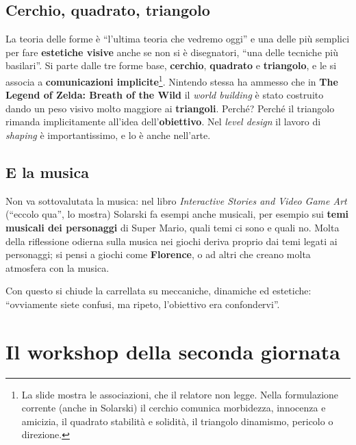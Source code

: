 \subsection{Cerchio, quadrato, triangolo}

La teoria delle forme è ``l'ultima teoria che vedremo oggi'' e una delle più
semplici per fare \textbf{estetiche visive} anche se non si è disegnatori, ``una
delle tecniche più basilari''. Si parte dalle tre forme base, \textbf{cerchio},
\textbf{quadrato} e \textbf{triangolo}, e le si associa a \textbf{comunicazioni
implicite}\footnote{La slide mostra le associazioni, che il relatore non legge.
Nella formulazione corrente (anche in Solarski) il cerchio comunica morbidezza,
innocenza e amicizia, il quadrato stabilità e solidità, il triangolo dinamismo,
pericolo o direzione.}. Nintendo stessa ha ammesso che in \textbf{The Legend of
Zelda: Breath of the Wild} il \emph{world building} è stato costruito dando un
peso visivo molto maggiore ai \textbf{triangoli}. Perché? Perché il triangolo
rimanda implicitamente all'idea dell'\textbf{obiettivo}. Nel \emph{level design} il
lavoro di \emph{shaping} è importantissimo, e lo è anche nell'arte.

\subsection{E la musica}

Non va sottovalutata la musica: nel libro \emph{Interactive Stories and Video
Game Art} (``eccolo qua'', lo mostra) Solarski fa esempi anche musicali, per
esempio sui \textbf{temi musicali dei personaggi} di Super Mario, quali temi ci
sono e quali no. Molta della riflessione odierna sulla musica nei giochi deriva
proprio dai temi legati ai personaggi; si pensi a giochi come \textbf{Florence}, o
ad altri che creano molta atmosfera con la musica.

Con questo si chiude la carrellata su meccaniche, dinamiche ed estetiche: ``ovviamente
siete confusi, ma ripeto, l'obiettivo era confondervi''.

\section{Il workshop della seconda giornata}
\label{sec:z6-workshop-domani}

